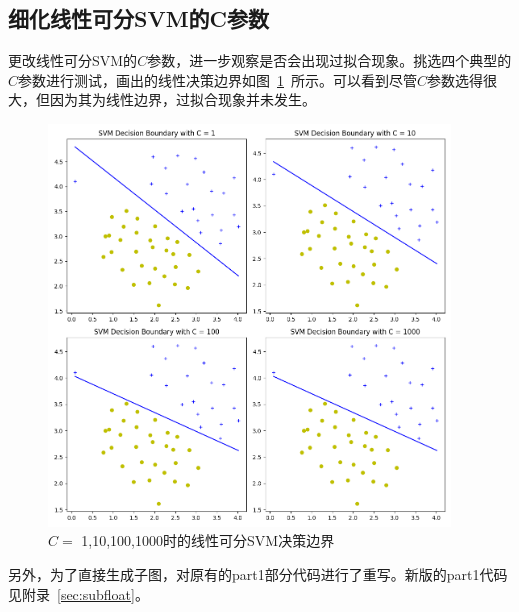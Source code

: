 \documentclass{SEU-AI-Report}
\begin{document}
\subsection{细化线性可分SVM的C参数}
更改线性可分SVM的$C$参数，进一步观察是否会出现过拟合现象。挑选四个典型的$C$参数进行测试，画出的线性决策边界如图~\ref{fig:linear4}~所示。可以看到尽管$C$参数选得很大，但因为其为线性边界，过拟合现象并未发生。
\begin{figure}[htbp]
    \centering
    \includegraphics[width=0.95\textwidth]{figure/svm.png}
    \caption{$C =$ 1,10,100,1000时的线性可分SVM决策边界}
    \label{fig:linear4}
\end{figure}

另外，为了直接生成子图，对原有的part1部分代码进行了重写。新版的part1代码见附录~\ref{sec:subfloat}。
\end{document}
